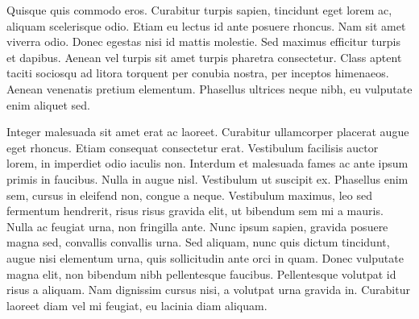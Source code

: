 \par
Quisque quis commodo eros. Curabitur turpis sapien, tincidunt eget lorem ac, aliquam scelerisque odio. Etiam eu lectus id ante posuere rhoncus. Nam sit amet viverra odio. Donec egestas nisi id mattis molestie. Sed maximus efficitur turpis et dapibus. Aenean vel turpis sit amet turpis pharetra consectetur. Class aptent taciti sociosqu ad litora torquent per conubia nostra, per inceptos himenaeos. Aenean venenatis pretium elementum. Phasellus ultrices neque nibh, eu vulputate enim aliquet sed.
\par
Integer malesuada sit amet erat ac laoreet. Curabitur ullamcorper placerat augue eget rhoncus. Etiam consequat consectetur erat. Vestibulum facilisis auctor lorem, in imperdiet odio iaculis non. Interdum et malesuada fames ac ante ipsum primis in faucibus. Nulla in augue nisl. Vestibulum ut suscipit ex. Phasellus enim sem, cursus in eleifend non, congue a neque. Vestibulum maximus, leo sed fermentum hendrerit, risus risus gravida elit, ut bibendum sem mi a mauris. Nulla ac feugiat urna, non fringilla ante. Nunc ipsum sapien, gravida posuere magna sed, convallis convallis urna. Sed aliquam, nunc quis dictum tincidunt, augue nisi elementum urna, quis sollicitudin ante orci in quam. Donec vulputate magna elit, non bibendum nibh pellentesque faucibus. Pellentesque volutpat id risus a aliquam. Nam dignissim cursus nisi, a volutpat urna gravida in. Curabitur laoreet diam vel mi feugiat, eu lacinia diam aliquam.